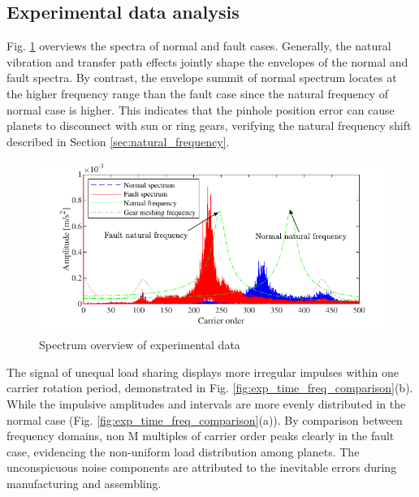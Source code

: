 \documentclass[a4paper,fleqn]{cas-sc}%
\begin{document}
\subsection{Experimental data analysis}
\par Fig. \ref{fig:exp_natural_frequency_shift} overviews the spectra of normal and fault cases. Generally, the natural vibration and transfer path effects jointly shape the envelopes of the normal and fault spectra. By contrast, the envelope summit of normal spectrum locates at the higher frequency range than the fault case since the natural frequency of normal case is higher. This indicates that the pinhole position error can cause planets to disconnect with sun or ring gears, verifying the natural frequency shift described in Section \ref{sec:natural_frequency}.
\begin{figure}[pos=htbp]
    \centering
    \includegraphics{Exp_natural_frequency_shift.pdf}
    \caption{Spectrum overview of experimental data}
    \label{fig:exp_natural_frequency_shift}
\end{figure}
\par The signal of unequal load sharing displays more irregular impulses within one carrier rotation period, demonstrated in Fig. \ref{fig:exp_time_freq_comparison}(b). While the impulsive amplitudes and intervals are more evenly distributed in the normal case (Fig. \ref{fig:exp_time_freq_comparison}(a)). By comparison between frequency domains, non M multiples of carrier order peaks clearly in the fault case, evidencing the non-uniform load distribution among planets. The unconspicuous noise components are attributed to the inevitable errors during manufacturing and assembling.
\end{document}
